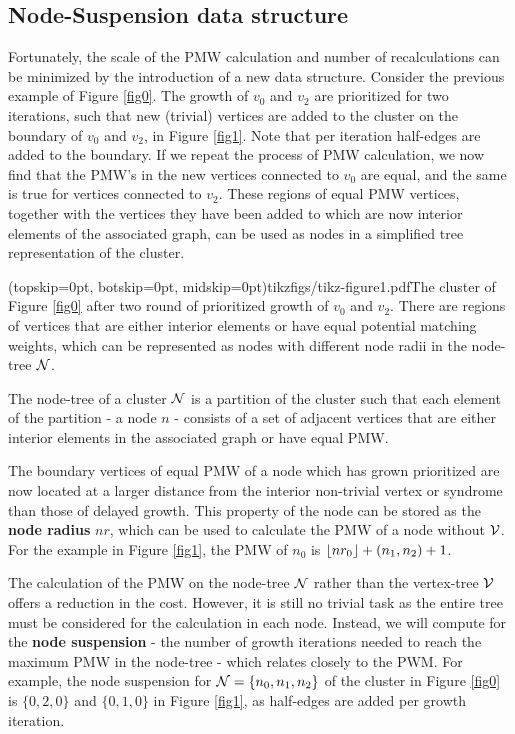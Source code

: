 \subsection{Node-Suspension data structure}\label{sec:nodeset}

Fortunately, the scale of the PMW calculation and number of recalculations can be minimized by the introduction of a new data structure. Consider the previous example of Figure \ref{fig0}. The growth of $v_0$ and $v_2$ are prioritized for two iterations, such that new (trivial) vertices are added to the cluster on the boundary of $v_0$ and $v_2$, in Figure \ref{fig1}. Note that per iteration half-edges are added to the boundary. If we repeat the process of PMW calculation, we now find that the PMW's in the new vertices connected to $v_0$ are equal, and the same is true for vertices connected to $v_2$. These regions of equal PMW vertices, together with the vertices they have been added to which are now interior elements of the associated graph, can be used as nodes in a simplified tree representation of the cluster. 

\Figure[htb](topskip=0pt, botskip=0pt, midskip=0pt){tikzfigs/tikz-figure1.pdf}{The cluster of Figure \ref{fig0} after two round of prioritized growth of $v_0$ and $v_2$. There are regions of vertices that are either interior elements or have equal potential matching weights, which can be represented as nodes with different node radii in the node-tree $\mathcal{N}$. \label{fig1}}

\begin{definition}
  The node-tree of a cluster $\mathcal{N}$ is a partition of the cluster such that each element of the partition - a node $n$ - consists of a set of adjacent vertices that are either interior elements in the associated graph or have equal PMW. 
\end{definition}

The boundary vertices of equal PMW of a node which has grown prioritized are now located at a larger distance from the interior non-trivial vertex or syndrome than those of delayed growth. This property of the node can be stored as the \textbf{node radius} $nr$, which can be used to calculate the PMW of a node without $\mathcal{V}$. For the example in Figure \ref{fig1}, the PMW of $n_0$ is ${\left \lfloor nr_0 \right \rfloor } + (n_1, n_2) + 1$.

The calculation of the PMW on the node-tree $\mathcal{N}$ rather than the vertex-tree $\mathcal{V}$ offers a reduction in the cost. However, it is still no trivial task as the entire tree must be considered for the calculation in each node. Instead, we will compute for the \textbf{node suspension} - the number of growth iterations needed to reach the maximum PMW in the node-tree - which relates closely to the PWM. For example, the node suspension for $\mathcal{N} = \{n_0, n_1, n_2\}$ of the cluster in Figure \ref{fig0} is $\{0, 2, 0\}$ and $\{0, 1, 0\}$ in Figure \ref{fig1}, as half-edges are added per growth iteration. 

